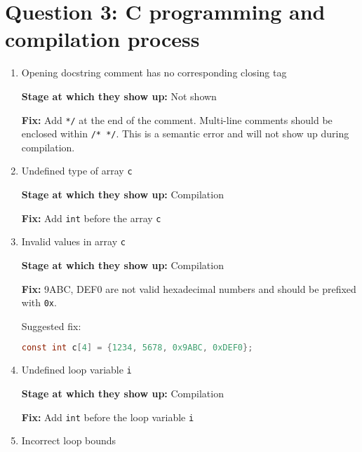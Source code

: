 \section*{Question 3: \small{C programming and compilation process}}



\begin{enumerate}

      \item Opening docstring comment has no corresponding closing tag

            \textbf{Stage at which they show up:}
            Not shown

            \textbf{Fix:}
            Add \texttt{*/} at the end of the comment.
            Multi-line comments should be enclosed within \texttt{/* */}.
            This is a semantic error and will not show up during compilation.

      \item Undefined type of array \texttt{c}

            \textbf{Stage at which they show up:}
            Compilation

            \textbf{Fix:}
            Add \texttt{int} before the array \texttt{c}

      \item Invalid values in array \texttt{c}

            \textbf{Stage at which they show up:}
            Compilation

            \textbf{Fix:}
            9ABC, DEF0 are not valid hexadecimal numbers and should be prefixed with \texttt{0x}.

            Suggested fix:
            \begin{lstlisting}[language=C, frame=single]
const int c[4] = {1234, 5678, 0x9ABC, 0xDEF0};
            \end{lstlisting}

      \item Undefined loop variable \texttt{i}

            \textbf{Stage at which they show up:}
            Compilation

            \textbf{Fix:}
            Add \texttt{int} before the loop variable \texttt{i}

      \item Incorrect loop bounds


\end{enumerate}
